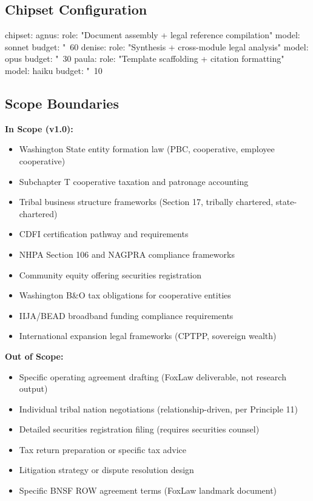 \documentclass[11pt,letterpaper]{article}
\begin{document}
\subsection{Chipset Configuration}

\begin{asciibox}
chipset:
  agnus:
    role: "Document assembly + legal reference compilation"
    model: sonnet
    budget: "~60%
  denise:
    role: "Synthesis + cross-module legal analysis"
    model: opus
    budget: "~30%
  paula:
    role: "Template scaffolding + citation formatting"
    model: haiku
    budget: "~10%
\end{asciibox}

\subsection{Scope Boundaries}

\textbf{In Scope (v1.0):}
\begin{itemize}[leftmargin=2em]
  \item Washington State entity formation law (PBC, cooperative, employee cooperative)
  \item Subchapter T cooperative taxation and patronage accounting
  \item Tribal business structure frameworks (Section 17, tribally chartered, state-chartered)
  \item CDFI certification pathway and requirements
  \item NHPA Section 106 and NAGPRA compliance frameworks
  \item Community equity offering securities registration
  \item Washington B\&O tax obligations for cooperative entities
  \item IIJA/BEAD broadband funding compliance requirements
  \item International expansion legal frameworks (CPTPP, sovereign wealth)
\end{itemize}

\textbf{Out of Scope:}
\begin{itemize}[leftmargin=2em]
  \item Specific operating agreement drafting (FoxLaw deliverable, not research output)
  \item Individual tribal nation negotiations (relationship-driven, per Principle 11)
  \item Detailed securities registration filing (requires securities counsel)
  \item Tax return preparation or specific tax advice
  \item Litigation strategy or dispute resolution design
  \item Specific BNSF ROW agreement terms (FoxLaw landmark document)
\end{itemize}
\end{document}

